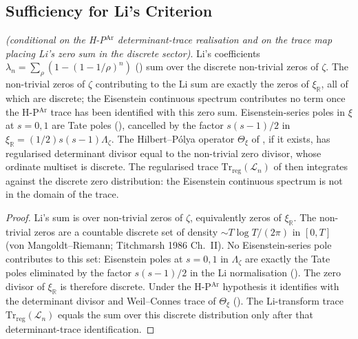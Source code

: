 \subsection{Sufficiency for Li's Criterion}
\label{v4-arith:w5-c:eisenstein:Li}

\begin{proposition}
\label{v4-arith:w5-c:prop:domain-suffices-for-Li}
\ClaimStatusProvedHereConditional \emph{(conditional on the
H-P\(^{\mathrm{Ar}}\) determinant-trace realisation and on the trace map placing
Li's zero sum in the discrete sector)}. Li's coefficients
\(\lambda_{n}=\sum_{\rho}(1-(1-1/\rho)^{n})\)
() sum over the discrete
non-trivial zeros of \(\zeta\). The non-trivial zeros of \(\zeta\) contributing to the Li sum are
exactly the zeros of \(\xi_{\mathbb{R}}\), all of which are discrete;
the Eisenstein continuous spectrum contributes no term once the
H-P\(^{\mathrm{Ar}}\) trace has been identified with this zero sum.
Eisenstein-series poles in \(\xi\) at \(s=0,1\) are Tate poles
(), cancelled by the factor
\(s(s-1)/2\) in
\(\xi_{\mathbb R}=(1/2)s(s-1)\Lambda_{\zeta}\). The Hilbert--P\'olya
operator \(\Theta_{\xi}\) of , if it exists,
has regularised determinant divisor equal to the non-trivial zero
divisor, whose ordinate multiset is discrete.
The regularised trace
\(\mathrm{Tr}_{\mathrm{reg}}(\mathcal L_{n})\) of
 then integrates against
the discrete zero distribution: the Eisenstein continuous spectrum is
not in the domain of the trace.
\end{proposition}

\begin{proof}
Li's sum is over non-trivial zeros of \(\zeta\), equivalently zeros of
\(\xi_{\mathbb R}\). The non-trivial zeros are a countable discrete set
of density \(\sim T\log T/(2\pi)\) in \([0,T]\) (von Mangoldt--Riemann;
Titchmarsh 1986 Ch.~II). No Eisenstein-series pole contributes to
this set: Eisenstein poles at \(s=0,1\) in \(\Lambda_{\zeta}\) are
exactly the Tate poles eliminated by the factor \(s(s-1)/2\) in the
Li normalisation
(). The zero divisor of
\(\xi_{\mathbb R}\) is therefore discrete. Under the
H-P\(^{\mathrm{Ar}}\) hypothesis it identifies with the determinant
divisor and Weil--Connes trace of \(\Theta_{\xi}\)
(). The Li-transform trace
\(\mathrm{Tr}_{\mathrm{reg}}(\mathcal L_{n})\) equals the sum over
this discrete distribution only after that determinant-trace
identification.
\end{proof}

